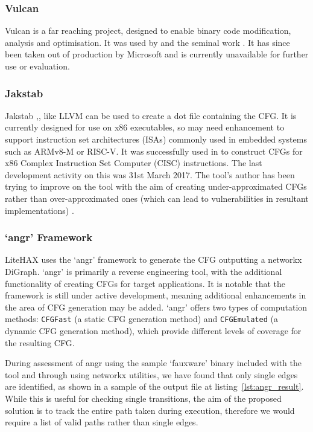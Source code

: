 \subsubsection*{Vulcan}

Vulcan \cite{Edwards2001} is a far reaching project, designed to enable binary code modification, analysis and optimisation. It was used by \cite{Davi2012} and the seminal work \cite{Abadi2005}. It has since been taken out of production by Microsoft and is currently unavailable for further use or evaluation.

\subsubsection*{Jakstab}

Jakstab \cite{Kinder2008},\cite{Kinder2010}, like LLVM can be used to create a dot file containing the CFG. It is currently designed for use on x86 executables, so may need enhancement to support instruction set architectures (ISAs) commonly used in embedded systems such as ARMv8-M or RISC-V. It was successfully used in \cite{Nguyen2013} to construct CFGs for x86 Complex Instruction Set Computer (CISC) instructions. The last development activity on this was 31st March 2017. The tool's author has been trying to improve on the tool with the aim of creating under-approximated CFGs rather than over-approximated ones (which can lead to vulnerabilities in resultant implementations) \cite{Kinder2012}.

\subsubsection*{`angr' Framework}

LiteHAX \cite{Dessouky2018} uses the `angr' \cite{Shoshitaishvili2016} framework to generate the CFG outputting a networkx \cite{Hagberg2008} DiGraph. `angr' is primarily a reverse engineering tool, with the additional functionality of creating CFGs for target applications. It is notable that the framework is still under active development, meaning additional enhancements in the area of CFG generation may be added. `angr' offers two types of computation methods: \verb|CFGFast| (a static CFG generation method) and \verb|CFGEmulated| (a dynamic CFG generation method), which provide different levels of coverage for the resulting CFG.  

During assessment of angr using the sample `fauxware' binary included with the tool and through using networkx utilities, we have found that only single edges are identified, as shown in a sample of the output file at listing~\ref{lst:angr_result}. While this is useful for checking single transitions, the aim of the proposed solution is to track the entire path taken during execution, therefore we would require a list of valid paths rather than single edges.

